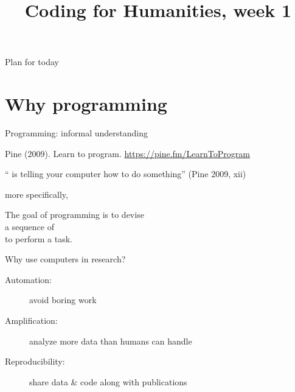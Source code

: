 \documentclass[aspectratio=169,usenames,dvipsnames]{beamer}
\title{Coding for Humanities, week 1}
\begin{document}
\begin{frame}
 \titlepage
\end{frame}

\begin{frame}{Plan for today}
 \tableofcontents
\end{frame}




\section{Why programming}
\frame{\tableofcontents[currentsection]}
\begin{frame}{Programming: informal understanding}
    \begin{reference}
        Pine (2009). Learn to program. \url{https://pine.fm/LearnToProgram}
    \end{reference}
    \begin{definition}
        `` is telling your computer
        how to do something'' (Pine 2009, xii)
    \end{definition}

    \pause\vspace{1em}
    more specifically,

    \vspace{1em}
    The goal of programming is to devise \\
    a sequence of  \\
    to perform a task.
\end{frame}

\begin{frame}{Why use computers in research?}
	\pause

    \begin{description}
        \item[Automation:] avoid boring work
        \item[Amplification:] analyze more data than humans can handle
        \item[Reproducibility:] share data \& code along with publications
    \end{description}
\end{frame}
\end{document}
